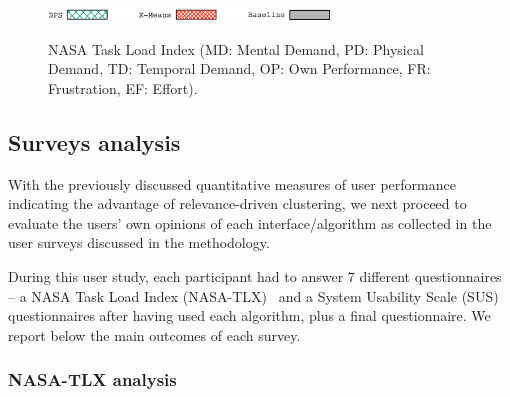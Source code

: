 \begin{figure}[t]
\begin{centering}
\includegraphics[width=7.5cm]{imgs/legend4}\\
\par\end{centering}
\caption{NASA Task Load Index (MD: Mental Demand, PD: Physical Demand, TD: Temporal Demand, OP: Own Performance, FR: Frustration, EF: Effort). }
\label{fig:NASA}
\end{figure}



\subsection{Surveys analysis}

With the previously discussed quantitative measures of user performance indicating the advantage of relevance-driven clustering, we next proceed to evaluate the users' own opinions of each interface/algorithm as collected in the user surveys discussed in the methodology.

During this user study, each participant had to answer 7 different questionnaires -- a NASA Task Load Index (NASA-TLX)~\cite{HART1988139} and a System Usability Scale (SUS)~\cite{brooke1996sus} questionnaires after having used each algorithm, plus a final questionnaire. We report below the main outcomes of each survey.




\subsubsection{NASA-TLX analysis}

